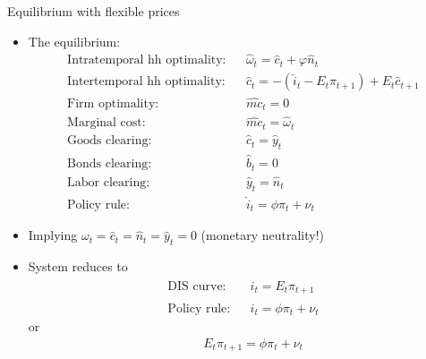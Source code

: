 \documentclass[9pt,xcolor={dvipsnames}]{beamer}
\newcommand{\bit}{\begin{itemize}}
\newcommand{\eit}{\end{itemize}}
\newcommand{\bc}{\color{blue}}
\begin{document}
\begin{frame}{Equilibrium with flexible prices}

\bit
\setlength\itemsep{1.5em}
\item The equilibrium:
\begin{eqnarray}
\text{Intratemporal hh optimality:} && \hat \omega_t = \hat c_t + \varphi \hat n_t  \nonumber \\
\text{Intertemporal hh optimality:} && \hat c_t =  - (\hat i_t - E_t \pi_{t+1}) + E_t \hat c_{t+1}  \nonumber \\
\text{Firm optimality:} && \widehat{mc}_t = 0 \nonumber \\
\text{Marginal cost:} && \widehat{mc}_t = \hat \omega_t \nonumber \\
\text{Goods clearing:} && \hat c_t = \hat y_t \nonumber \\
\text{Bonds clearing:} && \hat b_t = 0 \nonumber \\
\text{Labor clearing:} && \hat y_t = \hat n_t \nonumber \\
\text{Policy rule:} && \hat i_t = \phi \pi_t + \nu_t \nonumber 
\end{eqnarray}

\item Implying $\omega_t = \hat c_t = \hat n_t = \hat y_t = 0$ ({\bc monetary neutrality!})

\item System reduces to
\begin{eqnarray}
\text{DIS curve:} &&  \hat i_t = E_t \pi_{t+1}  \nonumber \\
\text{Policy rule:} && \hat i_t = \phi \pi_t + \nu_t \nonumber 
\end{eqnarray}
or
\begin{eqnarray}
&& E_t \pi_{t+1} = \phi \pi_t + \nu_t  \nonumber
\end{eqnarray}
\eit

\end{frame}
\end{document}
